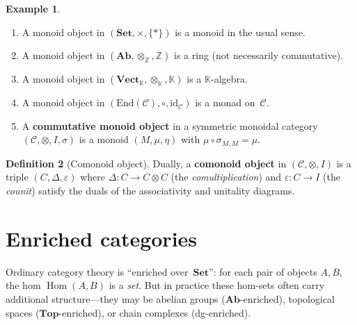 \documentclass[a4paper,12pt]{book}
\DeclareMathOperator{\Hom}{Hom}
\newcommand{\Set}{\mathbf{Set}}
\newcommand{\Ab}{\mathbf{Ab}}
\newcommand{\Top}{\mathbf{Top}}
\newcommand{\Vect}{\mathbf{Vect}}
\newcommand{\id}{\mathrm{id}}
\newcommand{\Z}{\mathbb{Z}}
\newcommand{\K}{\mathbb{K}}
\theoremstyle{definition}
\newtheorem{definition}{Definition}[section]
\newtheorem{example}[definition]{Example}
\theoremstyle{plain}
\theoremstyle{remark}
\begin{document}
\begin{example}\label{ex:monoid-objects}
\begin{enumerate}[label=(\roman*)]
\item A monoid object in $(\Set, \times, \{*\})$ is a monoid in the
      usual sense.
\item A monoid object in $(\Ab, \otimes_\Z, \Z)$ is a ring (not
      necessarily commutative).
\item A monoid object in $(\Vect_\K, \otimes_\K, \K)$ is a
      $\K$-algebra.
\item A monoid object in $(\mathrm{End}(\mathcal{C}), \circ, \id_\mathcal{C})$
      is a monad on~$\mathcal{C}$.
\item A \textbf{commutative monoid object} in a symmetric monoidal
      category $(\mathcal{C}, \otimes, I, \sigma)$ is a monoid $(M,\mu,\eta)$
      with $\mu \circ \sigma_{M,M} = \mu$.
\end{enumerate}
\end{example}

\begin{definition}[Comonoid object]\label{def:comonoid}
Dually, a \textbf{comonoid object} in $(\mathcal{C}, \otimes, I)$ is
a triple $(C, \Delta, \varepsilon)$ where
$\Delta\colon C\to C\otimes C$ (the \emph{comultiplication}) and
$\varepsilon\colon C\to I$ (the \emph{counit}) satisfy the duals of
the associativity and unitality diagrams.
\end{definition}



\section{Enriched categories}\label{sec:enriched}


Ordinary category theory is ``enriched over~$\Set$'': for each pair of
objects $A,B$, the hom $\Hom(A,B)$ is a \emph{set}.  But in practice
these hom-sets often carry additional structure---they may be abelian
groups ($\Ab$-enriched), topological spaces ($\Top$-enriched), or
chain complexes (dg-enriched).
\end{document}
